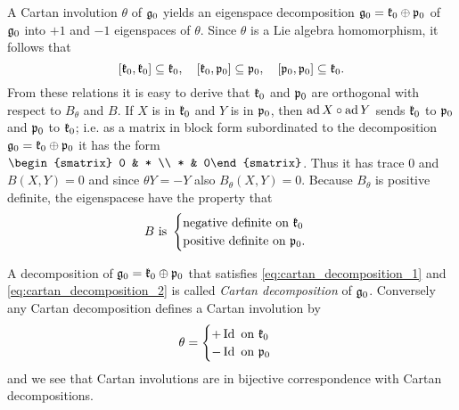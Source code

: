 A Cartan involution $\theta$ of $\mathfrak{g}_0$ yields an eigenspace decomposition $\mathfrak{g}_0 = \mathfrak{k}_0 \oplus \mathfrak{p}_0$ of $\mathfrak{g}_0$ into $+1$ and $-1$ eigenspaces of $\theta$. Since $\theta$ is a Lie algebra homomorphism, it follows that
\begin{equation}\label{eq:cartan_decomposition_1}
 [\mathfrak{k}_0,\mathfrak{k}_0] \subseteq \mathfrak{k}_0, \quad[\mathfrak{k}_0,\mathfrak{p}_0] \subseteq \mathfrak{p}_0, \quad [\mathfrak{p}_0,\mathfrak{p}_0] \subseteq \mathfrak{k}_0.
\end{equation}
From these relations it is easy to derive that $\mathfrak{k}_0$ and $\mathfrak{p}_0$ are orthogonal with respect to $B_\theta$ and $B$. If $X$ is in $\mathfrak{k}_0$ and $Y$ is in $\mathfrak{p}_0$, then $\operatorname{\mathrm{ad}} X \circ \operatorname{\mathrm{ad}} Y $ sends $\mathfrak{k}_0$ to $\mathfrak{p}_0$ and $\mathfrak{p}_0$ to $\mathfrak{k}_0$; i.e. as a matrix in block form subordinated to the decomposition $\mathfrak{g}_0 = \mathfrak{k}_0 \oplus \mathfrak{p}_0$ it has the form $\begin{smatrix} 0 & * \\ * & 0\end{smatrix}$. Thus it has trace $0$ and $B(X,Y) = 0$ and since $\theta Y = - Y$ also $B_\theta (X,Y) = 0$. Because $B_\theta$ is positive definite, the eigenspacese have the property that
\begin{equation}\label{eq:cartan_decomposition_2}
 B \text{ is } \begin{cases} \text{negative definite on } \mathfrak{k}_0 \\ \text{positive definite on } \mathfrak{p}_0. \end{cases}
\end{equation}

A decomposition of $\mathfrak{g}_0 = \mathfrak{k}_0 \oplus \mathfrak{p}_0$ that satisfies \eqref{eq:cartan_decomposition_1} and \eqref{eq:cartan_decomposition_2} is called \emph{Cartan decomposition} of $\mathfrak{g}_0$. Conversely any Cartan decomposition defines a Cartan involution by
\[
\theta =
 \begin{cases}
  + \operatorname{\mathrm{Id}} \text{ on } \mathfrak{k}_0 \\
  - \operatorname{\mathrm{Id}} \text{ on } \mathfrak{p}_0
 \end{cases}
\]
and we see that Cartan involutions are in bijective correspondence with Cartan decompositions.

